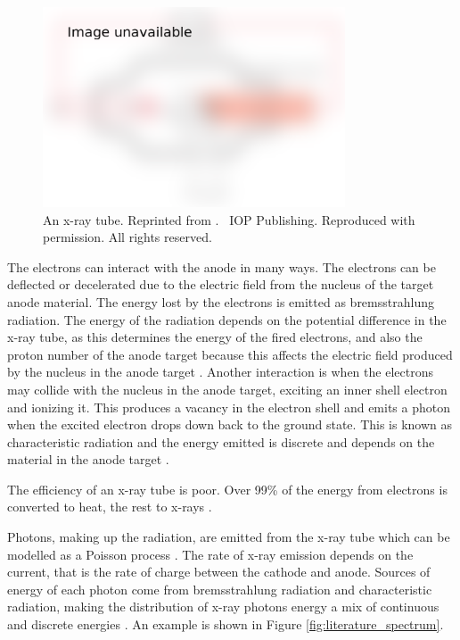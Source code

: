 \begin{figure}
  \centering
  \includegraphics[width=0.8\textwidth]{../figures/literatureReview/literature_tube.png}
  \caption{An x-ray tube. Reprinted from \cite{michael2001x}. \textcopyright\ IOP Publishing. Reproduced with permission. All rights reserved.}
  \label{fig:literature_tube}
\end{figure}

The electrons can interact with the anode in many ways. The electrons can be deflected or decelerated due to the electric field from the nucleus of the target anode material. The energy lost by the electrons is emitted as bremsstrahlung radiation. The energy of the radiation depends on the potential difference in the x-ray tube, as this determines the energy of the fired electrons, and also the proton number of the anode target because this affects the electric field produced by the nucleus in the anode target \citep{sun2012overview}. Another interaction is when the electrons may collide with the nucleus in the anode target, exciting an inner shell electron and ionizing it. This produces a vacancy in the electron shell and emits a photon when the excited electron drops down back to the ground state. This is known as characteristic radiation and the energy emitted is discrete and depends on the material in the anode target \citep{sun2012overview}.

The efficiency of an x-ray tube is poor. Over 99\% of the energy from electrons is converted to heat, the rest to x-rays \citep{kruth2011computed}.

Photons, making up the radiation, are emitted from the x-ray tube which can be modelled as a Poisson process \citep{whiting2006properties, cierniak2011x}. The rate of x-ray emission depends on the current, that is the rate of charge between the cathode and anode. Sources of energy of each photon come from bremsstrahlung radiation and characteristic radiation, making the distribution of x-ray photons energy a mix of continuous and discrete energies \citep{sun2012overview}. An example is shown in Figure \ref{fig:literature_spectrum}.

